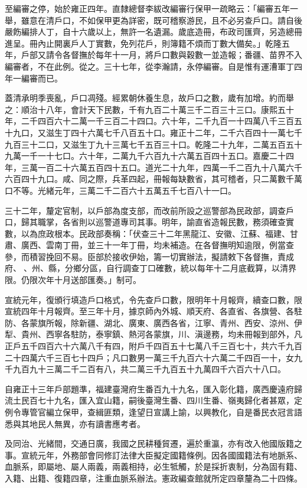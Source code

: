 \begin{pinyinscope}
至編審之停，始於雍正四年。直隸總督李紱改編審行保甲一疏略云：「編審五年一舉，雖意在清戶口，不如保甲更為詳密，既可稽察游民，且不必另查戶口。請自後嚴飭編排人丁，自十六歲以上，無許一名遺漏。歲底造冊，布政司匯齊，另造總冊進呈。冊內止開裏戶人丁實數，免列花戶，則簿籍不煩而丁數大備矣。」乾隆五年，戶部又請令各督撫於每年十一月，將戶口數與穀數一並造報；番疆、苗界不入編審者，不在此例。從之。三十七年，從李瀚請，永停編審。自是惟有運漕軍丁四年一編審而已。

蓋清承明季喪亂，戶口凋殘。經累朝休養生息，故戶口之數，歲有加增。約而舉之：順治十八年，會計天下民數，千有九百二十萬三千二百三十三口。康熙五十年，二千四百六十二萬一千三百二十四口。六十年，二千九百一十四萬八千三百五十九口，又滋生丁四十六萬七千八百五十口。雍正十二年，二千六百四十一萬七千九百三十二口，又滋生丁九十三萬七千五百三十口。乾隆二十九年，二萬五百五十九萬一千一十七口。六十年，二萬九千六百九十六萬五百四十五口。嘉慶二十四年，三萬一百二十六萬五百四十五口。道光二十九年，四萬一千二百九十八萬六千六百四十九口。咸、同之際，兵革四起，冊報每缺數省，其可稽者，只二萬數千萬口不等。光緒元年，三萬二千二百六十五萬五千七百八十一口。

三十二年，釐定官制，以戶部為度支部，而改前所設之巡警部為民政部，調查戶口，歸其職掌，各省則以巡警道專司其事。明年，諭直省造報民數，務須確查實數，以為庶政根本。民政部奏稱：「伏查三十二年黑龍江、安徽、江蘇、福建、甘肅、廣西、雲南丁冊，並三十一年丁冊，均未補造。在各督撫明知逾限，例當查參，而積習挽回不易。臣部於接收伊始，籌一切實辦法，擬請敕下各督撫，責成府、、州、縣，分鄉分區，自行調查丁口確數，統以每年十二月底截算，以清界限。仍限次年十月送部匯奏。」制可。

宣統元年，復頒行填造戶口格式，令先查戶口數，限明年十月報齊，續查口數，限宣統四年十月報齊。至三年十月，據京師內外城、順天府、各直省、各旗營、各駐防、各蒙旗所報，除新疆、湖北、廣東、廣西各省，江寧、青州、西安、涼州、伊犁、貴州、西寧各駐防，泰寧鎮、熱河各蒙旗，川、滇邊務，均未冊報到部外，凡正戶五千四百六十六萬八千有四，附戶千四百五十七萬八千三百七十，共六千九百二十四萬六千三百七十四戶；凡口數男一萬三千九百六十六萬二千四百一十，女九千九百九十三萬二千二百有八，共二萬三千九百五十九萬四千六百六十八口。

自雍正十三年戶部題準，福建臺灣府生番百九十九名，匯入彰化籍，廣西慶遠府歸流土民百七十九名，匯入宜山籍，嗣後臺灣生番、四川生番、嶺夷歸化者甚眾，定例令專管官編立保甲，查緝匪類，逢望日宣講上諭，以興教化，自是番民衣冠言語悉與其地民人無異，亦有讀書應考者。

及同治、光緒間，交通日廣，我國之民耕種貿遷，遍於重瀛，亦有改入他國版籍之事。宣統元年，外務部會同修訂法律大臣擬定國籍條例。因各國國籍法有地脈系、血脈系，即屬地、屬人兩義，兩義相持，必生牴觸，於是採折衷制，分為固有籍、入籍、出籍、復籍四章，注重血脈系辦法。憲政編查館就所定四章釐為二十四條。


\end{pinyinscope}

